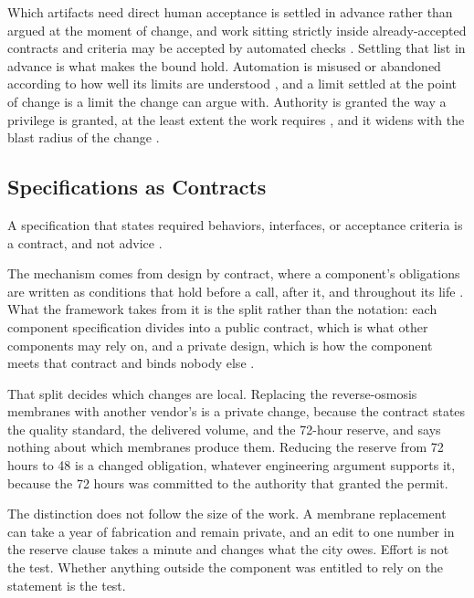 Which artifacts need direct human acceptance is settled in advance rather than argued at the moment of change, and work sitting strictly inside already-accepted contracts and criteria may be accepted by automated checks \citep[Sections~\hyperlink{nss-7.10}{7.10} and~\hyperlink{nss-7.19}{7.19}]{pss2026}. Settling that list in advance is what makes the bound hold. Automation is misused or abandoned according to how well its limits are understood \citep{parasuraman1997}, and a limit settled at the point of change is a limit the change can argue with. Authority is granted the way a privilege is granted, at the least extent the work requires \citep{saltzer1975}, and it widens with the blast radius of the change \citep[Section~\hyperlink{nss-15.3}{15.3}]{pss2026}.

\subsection{Specifications as Contracts}

A specification that states required behaviors, interfaces, or acceptance criteria is a contract, and not advice \citep{tbf2026}.

The mechanism comes from design by contract, where a component's obligations are written as conditions that hold before a call, after it, and throughout its life \citep{meyer1992}. What the framework takes from it is the split rather than the notation: each component specification divides into a public contract, which is what other components may rely on, and a private design, which is how the component meets that contract and binds nobody else \citep[Sections~\hyperlink{nss-6.2}{6.2} and~\hyperlink{nss-6.3}{6.3}]{pss2026}.

That split decides which changes are local. Replacing the reverse-osmosis membranes with another vendor's is a private change, because the contract states the quality standard, the delivered volume, and the 72-hour reserve, and says nothing about which membranes produce them. Reducing the reserve from 72 hours to 48 is a changed obligation, whatever engineering argument supports it, because the 72 hours was committed to the authority that granted the permit.

The distinction does not follow the size of the work. A membrane replacement can take a year of fabrication and remain private, and an edit to one number in the reserve clause takes a minute and changes what the city owes. Effort is not the test. Whether anything outside the component was entitled to rely on the statement is the test.

